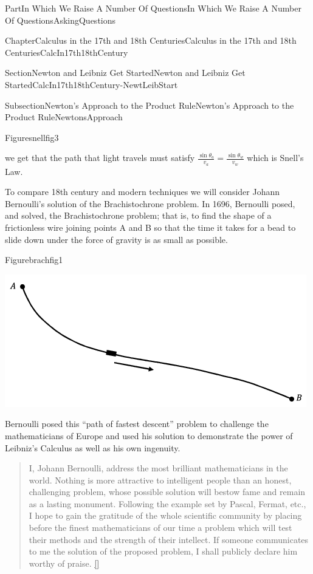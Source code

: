 \documentclass[oneside,10pt,]{book}
\newcommand{\xreffont}{\relax}
\numberwithin{equation}{part}
\begin{document}
\begin{partptx}{Part}{In Which We Raise A Number Of Questions}{}{In Which We Raise A Number Of Questions}{}{}{AskingQuestions}
\begin{chapterptx}{Chapter}{Calculus in the 17th and 18th Centuries}{}{Calculus in the 17th and 18th Centuries}{}{}{CalcIn17th18thCentury}
\begin{sectionptx}{Section}{Newton and Leibniz Get Started}{}{Newton and Leibniz Get Started}{}{}{CalcIn17th18thCentury-NewtLeibStart}
\begin{subsectionptx}{Subsection}{Newton's Approach to the Product Rule}{}{Newton's Approach to the Product Rule}{}{}{NewtonsApproach}
\begin{figureptx}{Figure}{}{snellfig3}{}
\begin{image}{0.125}{0.75}{0.125}{}
\end{image}%
\tcblower
\end{figureptx}%
we get that the path that light travels must satisfy \(\frac{\sin\theta_a}{v_a}=\frac{\sin\theta_w}{v_w}\) which is Snell's Law.%
\par
{} To compare 18th century and modern techniques we will consider Johann Bernoulli's solution of the Brachistochrone problem. In 1696, Bernoulli posed, and solved, the Brachistochrone problem; that is, to find the shape of a frictionless wire joining points A and B so that the time it takes for a bead to slide down under the force of gravity is as small as possible.%
\begin{figureptx}{Figure}{}{brachfig1}{}%
\begin{image}{0.125}{0.75}{0.125}{}%
\includegraphics[width=\linewidth]{external/images/brachfig1.png}
\end{image}%
\tcblower
\end{figureptx}%
Bernoulli posed this ``path of fastest descent'' problem to challenge the mathematicians of Europe and used his solution to demonstrate the power of Leibniz's Calculus as well as his own ingenuity.  %
\begin{quote}%
I, Johann Bernoulli, address the most brilliant mathematicians in the world. Nothing is more attractive to intelligent people than an honest, challenging problem, whose possible solution will bestow fame and remain as a lasting monument. Following the example set by Pascal, Fermat, etc., I hope to gain the gratitude of the whole scientific community by placing before the finest mathematicians of our time a problem which will test their methods and the strength of their intellect. If someone communicates to me the solution of the proposed problem, I shall publicly declare him worthy of praise. \hyperlink{Bernoulli_bio_mactutor}{[{\xreffont 11}]}%

\end{quote}
\end{subsectionptx}
\end{sectionptx}
\end{chapterptx}
\end{partptx}
\end{document}

